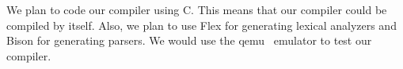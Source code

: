 We plan to code our compiler using C. This means that our compiler 
could be compiled by itself. Also, we plan to use Flex for generating 
lexical analyzers and Bison for generating parsers. We would use the qemu~\cite{Qemu}
emulator to test our compiler.